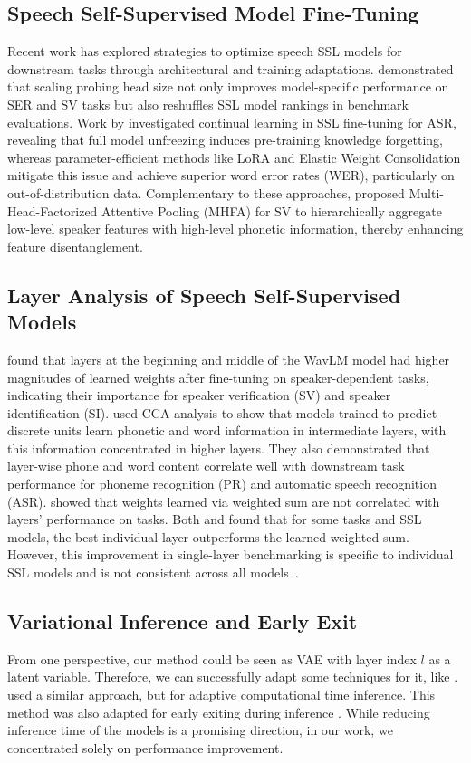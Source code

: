 \subsection{Speech Self-Supervised Model Fine-Tuning}
Recent work has explored strategies to optimize speech SSL models for downstream tasks through architectural and training adaptations. \cite{zaiem2024speech} demonstrated that scaling probing head size not only improves model-specific performance on SER and SV tasks but also reshuffles SSL model rankings in benchmark evaluations. Work by \cite{zaiem2024less} investigated continual learning in SSL fine-tuning for ASR, revealing that full model unfreezing induces pre-training knowledge forgetting, whereas parameter-efficient methods like LoRA and Elastic Weight Consolidation mitigate this issue and achieve superior word error rates (WER), particularly on out-of-distribution data. Complementary to these approaches, \cite{peng2022ieee} proposed Multi-Head-Factorized Attentive Pooling (MHFA) for SV to hierarchically aggregate low-level speaker features with high-level phonetic information, thereby enhancing feature disentanglement.

\subsection{Layer Analysis of Speech Self-Supervised Models}
\cite{chen2022wavlm} found that layers at the beginning and middle of the WavLM model had higher magnitudes of learned weights after fine-tuning on speaker-dependent tasks, indicating their importance for speaker verification (SV) and speaker identification (SI). \cite{toyota23} used CCA analysis to show that models trained to predict discrete units learn phonetic and word information in intermediate layers, with this information concentrated in higher layers. They also demonstrated that layer-wise phone and word content correlate well with downstream task performance for phoneme recognition (PR) and automatic speech recognition (ASR). \cite{Yang24Foundations} showed that weights learned via weighted sum are not correlated with layers' performance on tasks. Both \cite{Yang24Foundations} and \cite{toyota23} found that for some tasks and SSL models, the best individual layer outperforms the learned weighted sum. However, this improvement in single-layer benchmarking is specific to individual SSL models and is not consistent across all models~\cite{toyota23}.

\subsection{Variational Inference and Early Exit}

From one perspective, our method could be seen as VAE \cite{vae_kingma} with layer index $l$ as a latent variable. Therefore, we can successfully adapt some techniques for it, like \cite{higgins2017betavae}. \cite{banino2021pondernet} used a similar approach, but for adaptive computational time \cite{graves2016adaptive} inference. This method was also adapted for early exiting during inference \cite{palbert}. While reducing inference time of the models is a promising direction, in our work, we concentrated solely on performance improvement.
